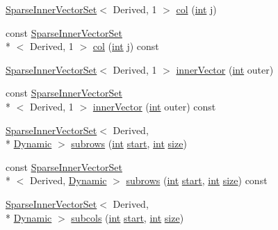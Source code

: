 \begin{DoxyCompactItemize}
\item 
\hyperlink{class_sparse_inner_vector_set}{Sparse\-Inner\-Vector\-Set}$<$ Derived, 1 $>$ \hyperlink{class_sparse_matrix_base_a711a8f11f5f1915057922412dac2cc25}{col} (\hyperlink{ioapi_8h_a787fa3cf048117ba7123753c1e74fcd6}{int} j)
\item 
const \hyperlink{class_sparse_inner_vector_set}{Sparse\-Inner\-Vector\-Set}\\*
$<$ Derived, 1 $>$ \hyperlink{class_sparse_matrix_base_a9349b9fa86c2b05bbff62de03a6d1d8b}{col} (\hyperlink{ioapi_8h_a787fa3cf048117ba7123753c1e74fcd6}{int} j) const 
\item 
\hyperlink{class_sparse_inner_vector_set}{Sparse\-Inner\-Vector\-Set}$<$ Derived, 1 $>$ \hyperlink{class_sparse_matrix_base_ad542ec077ac0acd7d6ca2f5799fa83b2}{inner\-Vector} (\hyperlink{ioapi_8h_a787fa3cf048117ba7123753c1e74fcd6}{int} outer)
\item 
const \hyperlink{class_sparse_inner_vector_set}{Sparse\-Inner\-Vector\-Set}\\*
$<$ Derived, 1 $>$ \hyperlink{class_sparse_matrix_base_a71e79fd3fddca23ca4be603f3fc9c661}{inner\-Vector} (\hyperlink{ioapi_8h_a787fa3cf048117ba7123753c1e74fcd6}{int} outer) const 
\item 
\hyperlink{class_sparse_inner_vector_set}{Sparse\-Inner\-Vector\-Set}$<$ Derived, \\*
\hyperlink{_constants_8h_adc9da5be31bdce40c25a92c27999c0e3}{Dynamic} $>$ \hyperlink{class_sparse_matrix_base_abe5b2b1ab8cd8ef794f2b087a2011d60}{subrows} (\hyperlink{ioapi_8h_a787fa3cf048117ba7123753c1e74fcd6}{int} \hyperlink{glext_8h_a13be19455586e95d5a42ed8f054afad2}{start}, \hyperlink{ioapi_8h_a787fa3cf048117ba7123753c1e74fcd6}{int} \hyperlink{glext_8h_a014d89bd76f74ef3a29c8f04b473eb76}{size})
\item 
const \hyperlink{class_sparse_inner_vector_set}{Sparse\-Inner\-Vector\-Set}\\*
$<$ Derived, \hyperlink{_constants_8h_adc9da5be31bdce40c25a92c27999c0e3}{Dynamic} $>$ \hyperlink{class_sparse_matrix_base_a2670bf78624b787932edcd53853cad0c}{subrows} (\hyperlink{ioapi_8h_a787fa3cf048117ba7123753c1e74fcd6}{int} \hyperlink{glext_8h_a13be19455586e95d5a42ed8f054afad2}{start}, \hyperlink{ioapi_8h_a787fa3cf048117ba7123753c1e74fcd6}{int} \hyperlink{glext_8h_a014d89bd76f74ef3a29c8f04b473eb76}{size}) const 
\item 
\hyperlink{class_sparse_inner_vector_set}{Sparse\-Inner\-Vector\-Set}$<$ Derived, \\*
\hyperlink{_constants_8h_adc9da5be31bdce40c25a92c27999c0e3}{Dynamic} $>$ \hyperlink{class_sparse_matrix_base_ad84d8261516776698d718d76a1ec2274}{subcols} (\hyperlink{ioapi_8h_a787fa3cf048117ba7123753c1e74fcd6}{int} \hyperlink{glext_8h_a13be19455586e95d5a42ed8f054afad2}{start}, \hyperlink{ioapi_8h_a787fa3cf048117ba7123753c1e74fcd6}{int} \hyperlink{glext_8h_a014d89bd76f74ef3a29c8f04b473eb76}{size})

\end{DoxyCompactItemize}
